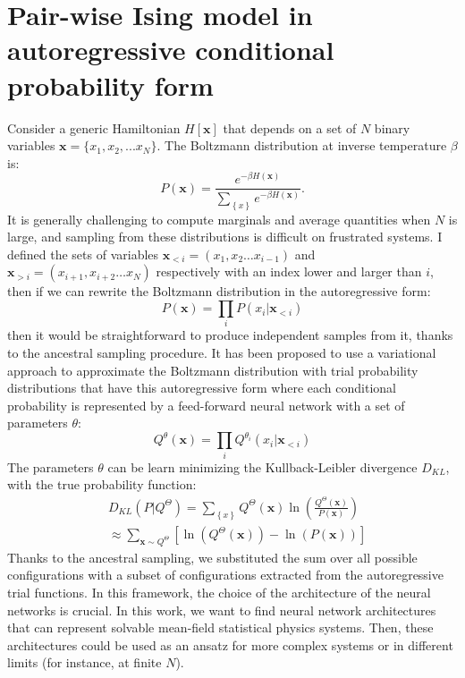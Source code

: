 \documentclass[aps,physrev,10pt,floatfix,longbibliography,nofootinbib,reprint]{revtex4-2}
\begin{document}
\section{Pair-wise Ising model in autoregressive conditional probability form}
Consider a generic Hamiltonian $H[\mathbf{x}]$ that depends on a set of $N$ binary variables $\mathbf{x}=\{x_1, x_2,...x_N\}$. The Boltzmann distribution at inverse temperature $\beta$ is:
\begin{equation}
P\left(\mathbf{x}\right)=\frac{e^{-\beta H\left(\mathbf{x}\right)}}{\sum_{\left\{ x\right\} }e^{-\beta H\left(\mathbf{x}\right)}}.
\end{equation}
It is generally challenging to compute marginals and average quantities when $N$ is large, and sampling from these distributions is difficult on frustrated systems. I defined the sets of variables $\mathbf{x}_{<i}=\left(x_{1},x_{2}\dots x_{i-1}\right)$ and $\mathbf{x}_{>i}=\left(x_{i+1},x_{i+2}\dots x_{N}\right)$ respectively with an index lower and larger than $i$, then if we can rewrite the Boltzmann distribution in the autoregressive form:
\begin{equation}
P\left(\mathbf{x}\right)=\prod_{i}P\left(x_{i}|\mathbf{x}_{<i}\right)
\end{equation}
then it would be straightforward to produce independent samples from it, thanks to the ancestral sampling procedure. It has been proposed to use a variational approach to approximate the Boltzmann distribution with trial probability distributions that have this autoregressive form where each conditional probability is represented by a feed-forward neural network with a set of parameters ${\theta}$:
\begin{equation}
Q^{\theta}\left(\mathbf{x}\right)=\prod_{i}Q^{\theta_i}\left(x_{i}|\mathbf{x}_{<i}\right)
\end{equation}
The parameters ${\theta}$ can be learn minimizing the Kullback-Leibler divergence $D_{KL}$,
with the true probability function:
\begin{equation}
\begin{split}
& D_{KL}\left(P|Q^{\Theta}\right) =  \sum_{\left\{ x\right\} }Q^{\Theta}\left(\mathbf{x} \right)\ln\left(\frac{Q^{\Theta}\left(\mathbf{x} \right)}{P\left(\mathbf{x} \right)}\right)  \\
& \approx \sum_{\mathbf{x}\sim Q^{\Theta}}\left[\ln\left(Q^{\Theta}\left(\mathbf{x} \right)\right)-\ln\left(P\left(\mathbf{x} \right)\right)\right]
\end{split}    
\end{equation}
Thanks to the ancestral sampling, we substituted the sum over all possible configurations with a subset of configurations extracted from the autoregressive trial functions.
In this framework, the choice of the architecture of the neural networks is crucial.
In this work, we want to find neural network architectures that can represent solvable  mean-field statistical physics systems. 
Then, these architectures could be used as an ansatz for more complex systems or in different limits (for instance, at finite $N$).
\end{document}
